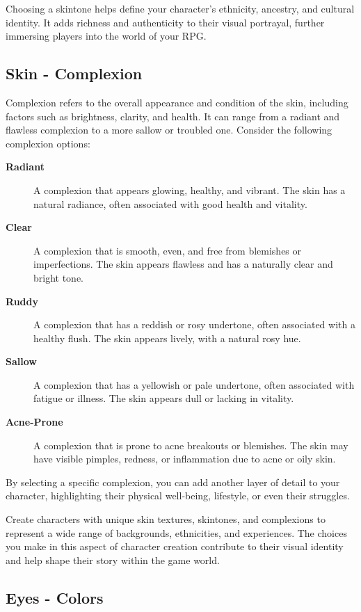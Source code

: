 \documentclass[12pt]{book}  %
\begin{document}
Choosing a skintone helps define your character's ethnicity, ancestry, and cultural identity. It adds richness and authenticity to their visual portrayal, further immersing players into the world of your RPG.

\subsection{\textbf{Skin  - Complexion}}

Complexion refers to the overall appearance and condition of the skin, including factors such as brightness, clarity, and health. It can range from a radiant and flawless complexion to a more sallow or troubled one. Consider the following complexion options:

\begin{description}
    \item[\textbf{Radiant}] A complexion that appears glowing, healthy, and vibrant. The skin has a natural radiance, often associated with good health and vitality.
    \item[\textbf{Clear}] A complexion that is smooth, even, and free from blemishes or imperfections. The skin appears flawless and has a naturally clear and bright tone.
    \item[\textbf{Ruddy}] A complexion that has a reddish or rosy undertone, often associated with a healthy flush. The skin appears lively, with a natural rosy hue.
    \item[\textbf{Sallow}] A complexion that has a yellowish or pale undertone, often associated with fatigue or illness. The skin appears dull or lacking in vitality.
    \item[\textbf{Acne-Prone}] A complexion that is prone to acne breakouts or blemishes. The skin may have visible pimples, redness, or inflammation due to acne or oily skin.
\end{description}

By selecting a specific complexion, you can add another layer of detail to your character, highlighting their physical well-being, lifestyle, or even their struggles.

Create characters with unique skin textures, skintones, and complexions to represent a wide range of backgrounds, ethnicities, and experiences. The choices you make in this aspect of character creation contribute to their visual identity and help shape their story within the game world.

\subsection{\textbf{Eyes - Colors}}
\end{document}
